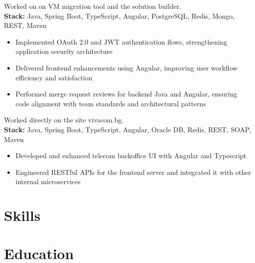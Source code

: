 \documentclass[11pt,a4paper,sans]{moderncv}
\begin{document}
    {
        Worked on on VM migration tool and the solution builder.\\[0.2em]
        \small\textbf{Stack:} Java, Spring Boot, TypeScript, Angular, PostgreSQL, Redis, Mongo, REST, Maven
    \vspace{5pt}
        \begin{itemize}[nosep, leftmargin=1.5em]
    \item Implemented OAuth 2.0 and JWT authentication flows, strengthening application security architecture
    \item Delivered frontend enhancements using Angular, improving user workflow efficiency and satisfaction
    \item Performed merge request reviews for backend Java and Angular, ensuring code alignment with team standards and architectural patterns
        \end{itemize}
    }

    {
        Worked directly on the site vivacom.bg.\\[0.2em]
        \small\textbf{Stack:} Java, Spring Boot, TypeScript, Angular, Oracle DB, Redis, REST, SOAP, Maven
    \vspace{5pt}
        \begin{itemize}[nosep, leftmargin=1.5em]
    \item Developed and enhanced telecom backoffice UI with Angular and Typescript
    \item Engineered RESTful APIs for the frontend server and integrated it with other internal microservices
        \end{itemize}
    }

    \section {\textbf{Skills}}

    \section {\textbf{Education}}
\end{document}
